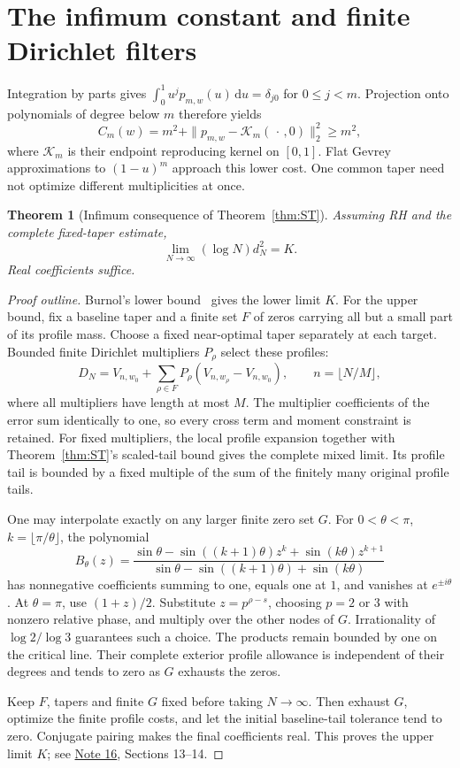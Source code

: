\documentclass[11pt]{article}
\newtheorem{theorem}{Theorem}
\newcommand{\dd}{\,\mathrm d}
\newcommand{\Nref}{\href{../notes/16_GEVREY_GLOBAL_APPROXIMATION_AND_RATE_20261020.md}{Note 16}}
\begin{document}
\section{The infimum constant and finite Dirichlet filters}
Integration by parts gives
\(\int_0^1u^jp_{m,w}(u)\dd u=\delta_{j0}\) for \(0\le j<m\).
Projection onto polynomials of degree below \(m\) therefore yields
\begin{equation}\label{eq:localfloor}
 C_m(w)=m^2+\|p_{m,w}-\mathcal K_m(\,\cdot\,,0)\|_2^2\ge m^2,
\end{equation}
where \(\mathcal K_m\) is their endpoint reproducing kernel on \([0,1]\).
Flat Gevrey approximations to \((1-u)^m\) approach this lower cost.
One common taper need not optimize different multiplicities at once.

\begin{theorem}[Infimum consequence of Theorem~\ref{thm:ST}]
Assuming RH and the complete fixed-taper estimate,
\begin{equation}\label{eq:inf}
             \lim_{N\to\infty}(\log N)d_N^2=K.
\end{equation}
Real coefficients suffice.
\end{theorem}
\begin{proof}[Proof outline]
Burnol's lower bound~\cite{Burnol} gives the lower limit \(K\).
For the upper bound, fix a baseline taper and a finite set \(F\) of
zeros carrying all but a small part of its profile mass. Choose a
fixed near-optimal taper separately at each target.
Bounded finite Dirichlet multipliers \(P_\rho\) select these profiles:
\[
 D_N=V_{n,w_0}+\sum_{\rho\in F}P_\rho
                  (V_{n,w_\rho}-V_{n,w_0}),\qquad n=\lfloor N/M\rfloor,
\]
where all multipliers have length at most \(M\).
The multiplier coefficients of the error sum identically to one,
so every cross term and moment constraint is retained.
For fixed multipliers, the local profile expansion together with
Theorem~\ref{thm:ST}'s scaled-tail bound gives the complete mixed limit. Its profile tail is bounded by a fixed multiple of the sum
of the finitely many original profile tails.

One may interpolate exactly on any larger finite zero set \(G\).
For \(0<\theta<\pi\), \(k=\lfloor\pi/\theta\rfloor\), the polynomial
\[
 B_\theta(z)=
 \frac{\sin\theta-\sin((k+1)\theta)z^k+\sin(k\theta)z^{k+1}}
      {\sin\theta-\sin((k+1)\theta)+\sin(k\theta)}
\]
has nonnegative coefficients summing to one, equals one at \(1\),
and vanishes at \(e^{\pm i\theta}\). At \(\theta=\pi\), use
\((1+z)/2\). Substitute \(z=p^{\rho-s}\), choosing \(p=2\) or \(3\)
with nonzero relative phase, and multiply over the other nodes of
\(G\). Irrationality of \(\log2/\log3\) guarantees such a choice.
The products remain bounded by one on the critical line.
Their complete exterior profile allowance is independent of their
degrees and tends to zero as \(G\) exhausts the zeros.

Keep \(F\), tapers and finite \(G\) fixed before taking \(N\to\infty\).
Then exhaust \(G\), optimize the finite profile costs, and let the
initial baseline-tail tolerance tend to zero. Conjugate
pairing makes the final coefficients real. This proves the upper
limit \(K\); see \Nref, Sections 13--14.
\end{proof}
\end{document}
